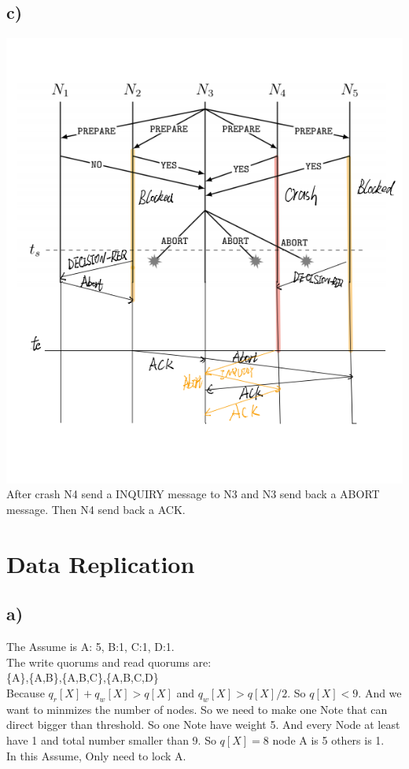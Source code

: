 \documentclass{article}
\begin{document}
  \subsection*{c)}
  \includegraphics{06.png}
  \\After crash N4 send a INQUIRY message to N3 and N3 send back a ABORT message. Then N4 send back a ACK.

  \section{Data Replication}
\subsection*{a)}
The Assume is  A: 5, B:1, C:1, D:1.
\\ The write quorums and read quorums are:
\\\{A\},\{A,B\},\{A,B,C\},\{A,B,C,D\}
\\Because $q_r[X]+ q_w[X]>q[X]$ and $q_w[X]>q[X]/2$. So $q[X]<9$. And we want to minmizes the number of nodes. So we need to make 
one Note that can direct bigger than threshold. So one Note have weight 5. And every Node at least have 1 and total number smaller 
than 9. So $q[X]=8$ node A is 5 others is 1. 
\\ In this Assume, Only need to lock A.
\end{document}
